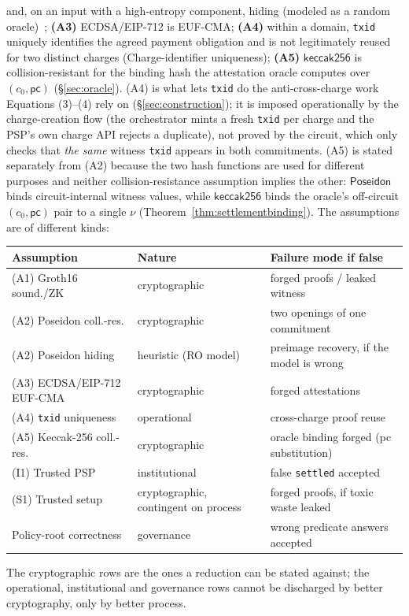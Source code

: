 \documentclass[11pt]{article}
\newcommand{\Poseidon}{\ensuremath{\mathsf{Poseidon}}}
\newcommand{\code}[1]{\texttt{#1}}
\begin{document}
and, on an input with a high-entropy component, hiding (modeled as a random
oracle)~\cite{poseidon}; \textbf{(A3)} ECDSA/EIP-712 is EUF-CMA; \textbf{(A4)}
within a domain, \code{txid} uniquely identifies the agreed payment obligation
and is not legitimately reused for two distinct charges (Charge-identifier
uniqueness); \textbf{(A5)} $\mathsf{keccak256}$ is collision-resistant for the
binding hash the attestation oracle computes over $(c_0,\mathsf{pc})$
(\S\ref{sec:oracle}). (A4) is what lets \code{txid} do the anti-cross-charge work
Equations (3)--(4) rely on (\S\ref{sec:construction}); it is imposed
operationally by the charge-creation flow (the orchestrator mints a fresh
\code{txid} per charge and the PSP's own charge API rejects a duplicate), not
proved by the circuit, which only checks that \emph{the same} witness
\code{txid} appears in both commitments. (A5) is stated separately from (A2)
because the two hash functions are used for different purposes and neither
collision-resistance assumption implies the other: $\Poseidon$ binds
circuit-internal witness values, while $\mathsf{keccak256}$ binds the
oracle's off-circuit $(c_0,\mathsf{pc})$ pair to a single $\nu$
(Theorem~\ref{thm:settlementbinding}). The assumptions are of different kinds:

\begin{center}
\small
\begin{tabular}{@{}lp{}p{}@{}}
\toprule
\textbf{Assumption} & \textbf{Nature} & \textbf{Failure mode if false} \\
\midrule
(A1) Groth16 sound./ZK & cryptographic & forged proofs / leaked witness \\
(A2) Poseidon coll.-res. & cryptographic & two openings of one commitment \\
(A2) Poseidon hiding & heuristic (RO model) & preimage recovery, if the model is wrong \\
(A3) ECDSA/EIP-712 EUF-CMA & cryptographic & forged attestations \\
(A4) \code{txid} uniqueness & operational & cross-charge proof reuse \\
(A5) Keccak-256 coll.-res. & cryptographic & oracle binding forged (pc substitution) \\
(I1) Trusted PSP & institutional & false \code{settled} accepted \\
(S1) Trusted setup & cryptographic, contingent on process & forged proofs, if toxic waste leaked \\
Policy-root correctness & governance & wrong predicate answers accepted \\
\bottomrule
\end{tabular}
\end{center}
\noindent The cryptographic rows are the ones a reduction can be stated
against; the operational, institutional and governance rows cannot be
discharged by better cryptography, only by better process.
\end{document}
